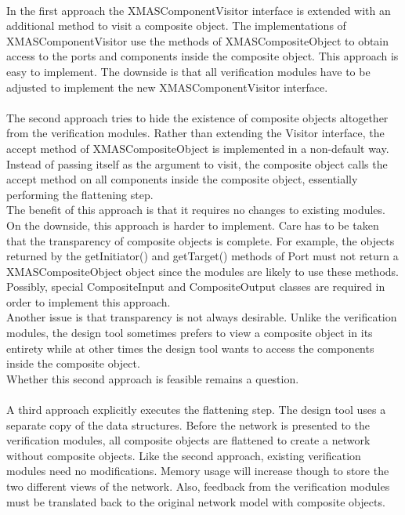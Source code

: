 \documentclass[a4paper,11pt]{article}
\begin{document}
\paragraph{}
In the first approach the XMASComponentVisitor interface is extended with an
additional method to visit a composite object. The implementations of XMASComponentVisitor
use the methods of XMASCompositeObject to obtain access to the ports and components
inside the composite object. This approach is easy to implement. The downside is
that all verification modules have to be adjusted to implement the new XMASComponentVisitor
interface.

\paragraph{}
The second approach tries to hide the existence of composite objects altogether
from the verification modules. Rather than extending the Visitor interface,
the accept method of XMASCompositeObject is implemented in a non-default way.
Instead of passing itself as the argument to visit, the composite object calls
the accept method on all components inside the composite object, essentially
performing the flattening step.\\
The benefit of this approach is that it requires no changes to existing modules.
On the downside, this approach is harder to implement. Care has to be taken
that the transparency of composite objects is complete. For example, the objects
returned by the getInitiator() and getTarget() methods of Port must not return a
XMASCompositeObject object since the modules are likely to use these methods.
Possibly, special CompositeInput and CompositeOutput classes are required in
order to implement this approach.\\
Another issue is that transparency is not always desirable.
Unlike the verification modules, the design tool sometimes prefers to
view a composite object in its entirety while at other times the design
tool wants to access the components inside the composite object.\\
Whether this second approach is feasible remains a question.

\paragraph{}
A third approach explicitly executes the flattening step. The design tool
uses a separate copy of the data structures. Before the network is
presented to the verification modules, all composite objects are flattened
to create a network without composite objects. Like the second approach,
existing verification modules need no modifications. Memory usage will
increase though to store the two different views of the network. Also,
feedback from the verification modules must be translated back to the
original network model with composite objects.
\end{document}
